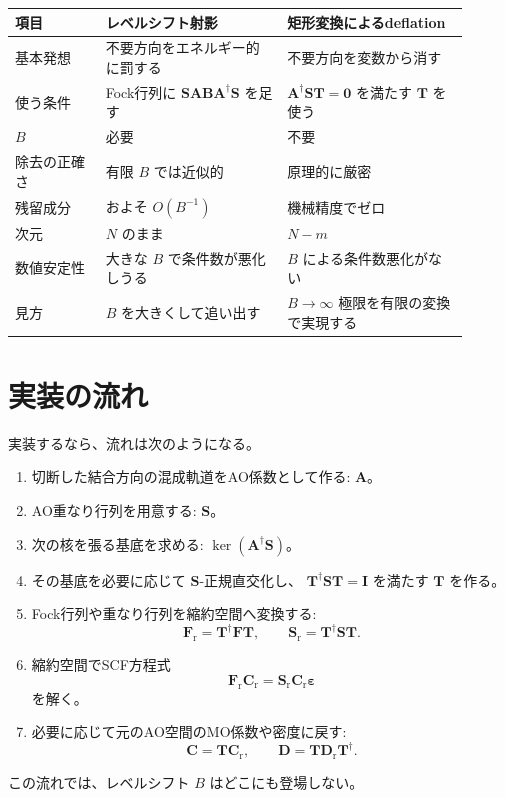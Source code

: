 \documentclass[uplatex,dvipdfmx,11pt]{jsarticle}
\newcommand{\Smat}{\mathbf S}
\newcommand{\Amat}{\mathbf A}
\newcommand{\Bmat}{\mathbf B}
\newcommand{\Tmat}{\mathbf T}
\newcommand{\Cmat}{\mathbf C}
\newcommand{\Cr}{\mathbf C_{\mathrm r}}
\newcommand{\Fmat}{\mathbf F}
\newcommand{\Fr}{\mathbf F_{\mathrm r}}
\newcommand{\Sr}{\mathbf S_{\mathrm r}}
\newcommand{\Dmat}{\mathbf D}
\newcommand{\Dr}{\mathbf D_{\mathrm r}}
\begin{document}
\begin{center}
\begin{tabular}{|p{0.18\linewidth}|p{0.36\linewidth}|p{0.36\linewidth}|}
\hline
\textbf{項目} & \textbf{レベルシフト射影} & \textbf{矩形変換によるdeflation} \\
\hline
基本発想 & 不要方向をエネルギー的に罰する & 不要方向を変数から消す \\
\hline
使う条件 & Fock行列に \(\Smat\Amat\Bmat\Amat^\dagger\Smat\) を足す &
\(\Amat^\dagger\Smat\Tmat=\mathbf 0\) を満たす \(\Tmat\) を使う \\
\hline
\(B\) & 必要 & 不要 \\
\hline
除去の正確さ & 有限 \(B\) では近似的 & 原理的に厳密 \\
\hline
残留成分 & およそ \(O(B^{-1})\) & 機械精度でゼロ \\
\hline
次元 & \(N\) のまま & \(N-m\) \\
\hline
数値安定性 & 大きな \(B\) で条件数が悪化しうる & \(B\) による条件数悪化がない \\
\hline
見方 & \(B\) を大きくして追い出す & \(B\to\infty\) 極限を有限の変換で実現する \\
\hline
\end{tabular}
\end{center}

\section{実装の流れ}

実装するなら、流れは次のようになる。
\begin{enumerate}
\item 切断した結合方向の混成軌道をAO係数として作る: \(\Amat\)。
\item AO重なり行列を用意する: \(\Smat\)。
\item 次の核を張る基底を求める: \(\ker(\Amat^\dagger\Smat)\)。
\item その基底を必要に応じて \(\Smat\)-正規直交化し、
      \(\Tmat^\dagger\Smat\Tmat=\mathbf I\) を満たす \(\Tmat\) を作る。
\item Fock行列や重なり行列を縮約空間へ変換する:
      \[
        \Fr=\Tmat^\dagger\Fmat\Tmat,\qquad
        \Sr=\Tmat^\dagger\Smat\Tmat .
      \]
\item 縮約空間でSCF方程式
      \[
        \Fr\Cr=\Sr\Cr\boldsymbol\varepsilon
      \]
      を解く。
\item 必要に応じて元のAO空間のMO係数や密度に戻す:
      \[
        \Cmat=\Tmat\Cr,\qquad
        \Dmat=\Tmat\Dr\Tmat^\dagger .
      \]
\end{enumerate}
この流れでは、レベルシフト \(B\) はどこにも登場しない。
\end{document}
